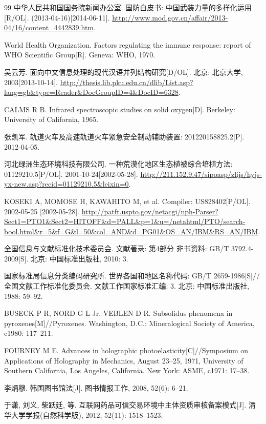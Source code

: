 \begin{thebibliography}{99}
 中华人民共和国国务院新闻办公室. 国防白皮书: 中国武装力量的多样化运用[R/OL]. (2013-04-16)[2014-06-11].  
\url{http://www.mod.gov.cn/affair/2013-04/16/content_4442839.htm}.

 World Health Organization. Factors regulating the immune response: report of WHO Scientific Group[R]. Geneva: WHO, 1970.

 吴云芳. 面向中文信息处理的现代汉语并列结构研究[D/OL]. 北京: 北京大学, 2003[2013-10-14].  
\url{http://thesis.lib.pku.edu.cn/dlib/List.asp?lang=gb\&type=Reader\&DocGroupID=4\&DocID=6328}.

 CALMS R B. Infrared spectroscopic studies on solid oxygen[D]. Berkeley: University of California, 1965.

 张凯军. 轨道火车及高速轨道火车紧急安全制动辅助装置: 201220158825.2[P]. 2012-04-05.

 河北绿洲生态环境科技有限公司. 一种荒漠化地区生态植被综合培植方法: 01129210.5[P/OL]. 2001-10-24[2002-05-28].  
\url{http://211.152.9.47/sipoasp/zlijs/hyjs-yx-new.asp?recid=01129210.5\&leixin=0}.

 KOSEKI A, MOMOSE H, KAWAHITO M, et al. Compiler: US828402[P/OL]. 2002-05-25 [2002-05-28].  
\url{http://patft.uspto.gov/netacgi/nph-Parser?Sect1=PTO1\&Sect2=HITOFF\&d=PALL\&p=1\&u=/netahtml/PTO/search-bool.html\&r=5\&f=G\&l=50\&col=AND\&d=PG01\&OS=AN/IBM\&RS=AN/IBM}.

 全国信息与文献标准化技术委员会. 文献著录: 第4部分 非书资料: GB/T 3792.4-2009[S]. 北京: 中国标准出版社, 2010: 3.

 国家标准局信息分类编码研究所. 世界各国和地区名称代码: GB/T 2659-1986[S]//全国文献工作标准化委员会. 文献工作国家标准汇编: 3. 北京: 中国标准出版社, 1988: 59–92.

 BUSECK P R, NORD G L Jr, VEBLEN D R. Subsolidus phenomena in pyroxenes[M]//Pyroxenes. Washington, D.C.: Mineralogical Society of America, c1980: 117–211.

 FOURNEY M E. Advances in holographic photoelasticity[C]//Symposium on Applications of Holography in Mechanics, August 23–25, 1971, University of Southern California, Los Angeles, California. New York: ASME, c1971: 17–38.

 李炳穆. 韩国图书馆法[J]. 图书情报工作, 2008, 52(6): 6–21.

 于潇, 刘义, 柴跃廷, 等. 互联网药品可信交易环境中主体资质审核备案模式[J]. 清华大学学报(自然科学版), 2012, 52(11): 1518–1523.


\end{thebibliography}

